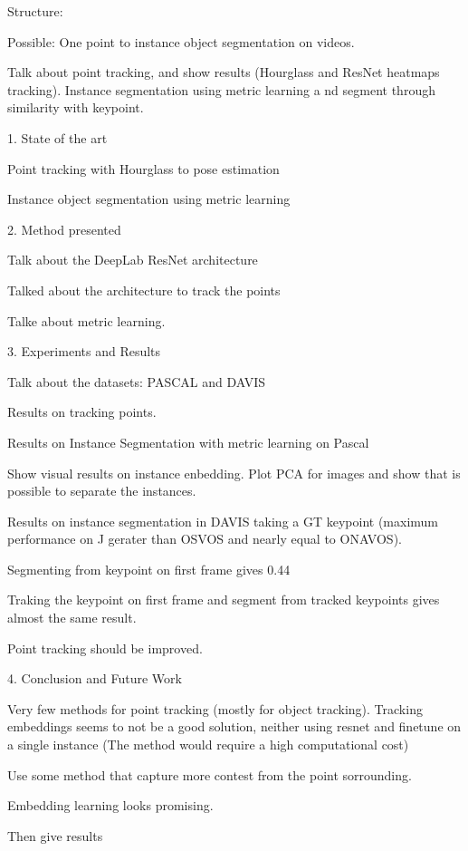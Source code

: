 Structure:

Possible: One point to instance object segmentation on videos.

Talk about point tracking, and show results (Hourglass and ResNet heatmaps tracking).
Instance segmentation using metric learning a nd segment through similarity with keypoint.

1. State of the art

Point tracking with Hourglass to pose estimation

Instance object segmentation using metric learning


2. Method presented

Talk about the DeepLab ResNet architecture

Talked about the architecture to track the points

Talke about metric learning.

3. Experiments and Results

Talk about the datasets: PASCAL and DAVIS

Results on tracking points.

Results on Instance Segmentation with metric learning on Pascal

Show visual results on instance enbedding. Plot PCA for images and show that is possible to separate the instances.

Results on instance segmentation in DAVIS taking a GT keypoint (maximum performance on J gerater than OSVOS and nearly equal to ONAVOS).

Segmenting from keypoint on first frame gives 0.44

Traking the keypoint on first frame and segment from tracked keypoints gives almost the same result.

Point tracking should be improved.

4. Conclusion and Future Work

Very few methods for point tracking (mostly for object tracking). Tracking embeddings seems to not be a good solution, neither using resnet and finetune on a single instance (The method would require a high computational cost)

Use some method that capture more contest from the point sorrounding.

Embedding learning looks promising.



Then give results
